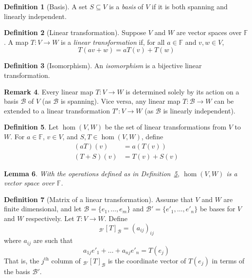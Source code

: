 \documentclass[10pt,fleqn]{article}
\newcommand{\field}{\mathbb{F}}
\newcommand{\basis}{\mathcal{B}}
\theoremstyle{definition} \newtheorem{defn}{Definition}[section]
\theoremstyle{plain}      \newtheorem{thm}[defn]{Theorem}
\theoremstyle{plain}      \newtheorem{prop}[defn]{Proposition}
\theoremstyle{plain}      \newtheorem{lem}[defn]{Lemma}
\theoremstyle{plain}      \newtheorem{cor}[defn]{Corollary}
\theoremstyle{plain}      \newtheorem{ad}[defn]{Addendum}
\theoremstyle{definition} \newtheorem{ex}[defn]{Example}
\theoremstyle{definition} \newtheorem{rem}[defn]{Remark}
\numberwithin{equation}{subsection}
\begin{document}
\begin{defn}[Basis]
    A set $S\subseteq V$ is a \emph{basis} of $V$ if it is both spanning and linearly independent.
\end{defn}

\begin{defn}[Linear transformation]
    Suppose $V$ and $W$ are vector spaces over $\field$.
    A map $T:V\to W$ is a \emph{linear transformation} if, for all $a\in\field$ and $v,w\in V$,
    \[
        T(av+w)=
        aT(v)+T(w)
    \]
\end{defn}

\begin{defn}[Isomorphism]
    An \emph{isomorphism} is a bijective linear transformation.
\end{defn}

\begin{rem}
    Every linear map $T:V\to W$ is determined solely by its action on a basis $\mathcal{B}$ of $V$ (as $\mathcal{B}$ is spanning).
    Vice versa, any linear map $T:\mathcal{B}\to W$ can be extended to a linear transformation $T':V\to W$ (as $\mathcal{B}$ is linearly independent).
\end{rem}

\begin{defn}\label{hom-defn}
    Let $\hom(V,W)$ be the set of linear transformations from $V$ to $W$.
    For $a\in\field$, $v\in V$, and $S,T\in\hom(V,W)$, define
    \begin{align*}
        (aT)(v)
        &=
        a(T(v))\\
        (T+S)(v)
        &=
        T(v)+S(v)
    \end{align*}
\end{defn}

\begin{lem}
    With the operations defined as in Definition~\ref{hom-defn}, $\hom(V,W)$ is a vector space over $\field$.
\end{lem}

\begin{defn}[Matrix of a linear transformation]
    Assume that $V$ and $W$ are finite dimensional, and let $\basis=\{e_1,\ldots,e_m\}$ and $\basis'=\{e'_1,\ldots,e'_n\}$ be bases for $V$ and $W$ respectively.
    Let $T:V\to W$.
    Define
    \[
        _{\basis'}[T]_{\basis}=
        (a_{ij})_{ij}
    \]
    where $a_{ij}$ are such that
    \[
        a_{1j}e'_1+\ldots+a_{nj}e'_n=
        T(e_j)
    \]
    That is, the $j^\text{th}$ column of $_{\basis'}[T]_{\basis}$ is the coordinate vector of $T(e_j)$ in terms of the basis $\basis'$.
\end{defn}
\end{document}
